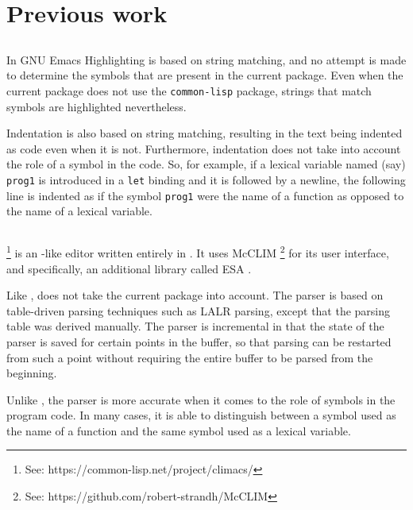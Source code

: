 \section{Previous work}

\subsection{\emacs{}}
\label{sec-previous-emacs}

In GNU Emacs
\cite{GNUEmacsLispReferenceManual,CraftOfTextEditiing,Finseth:1980:TPTa}
Highlighting is based on string matching, and no attempt is made to
determine the symbols that are present in the current package.
Even when the current package does not use the \texttt{common-lisp}
package, strings that match \commonlisp{} symbols are highlighted
nevertheless.

Indentation is also based on string matching, resulting in the text
being indented as \commonlisp{} code even when it is not.
Furthermore, indentation does not take into account the role of a
symbol in the code.  So, for example, if a lexical variable named
(say) \texttt{prog1} is introduced in a \texttt{let} binding and
it is followed by a newline, the following line is indented as if the
symbol \texttt{prog1} were the name of a \commonlisp{} function as
opposed to the name of a lexical variable.

\subsection{\climacs{}}

\climacs%
\footnote{See: https://common-lisp.net/project/climacs/}
is an \emacs{}-like editor written entirely in \commonlisp{}.  It uses
McCLIM%
\footnote{See: https://github.com/robert-strandh/McCLIM}
for its user interface, and specifically, an additional library called
ESA \cite{Strandh:2007:ECL:1622123.1622150}.

Like \emacs{}, \climacs{} does not take the current package into
account.  The parser is based on table-driven parsing techniques
such as LALR parsing, except that the parsing table was derived
manually.  The parser is incremental in that the state of the parser
is saved for certain points in the buffer, so that parsing can be
restarted from such a point without requiring the entire buffer to be
parsed from the beginning.

Unlike \emacs{}, the \climacs{} parser is more accurate when it comes
to the role of symbols in the program code.  In many cases, it is able
to distinguish between a symbol used as the name of a function and the
same symbol used as a lexical variable.


